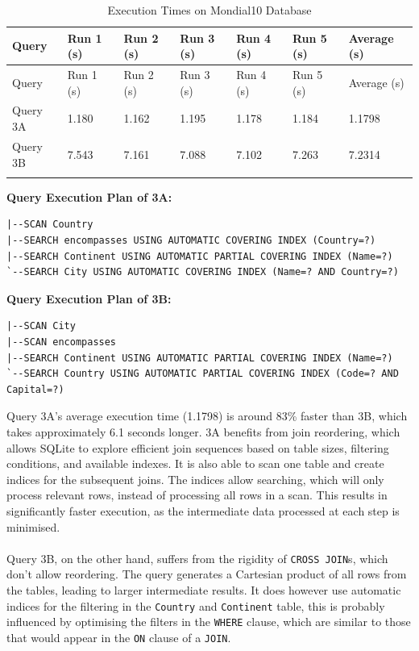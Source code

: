 \documentclass[11pt]{article}
\begin{document}
\begin{longtable}{|l|l|l|l|l|l|l|}
\hline
Query & Run 1 (s) & Run 2 (s) & Run 3 (s) & Run 4 (s) & Run 5 (s) & Average (s) \\
\hline
\endfirsthead
\hline
Query & Run 1 (s) & Run 2 (s) & Run 3 (s) & Run 4 (s) & Run 5 (s) & Average (s) \\
\hline
\endhead
Query 3A & 1.180 & 1.162 & 1.195 & 1.178 & 1.184 & 1.1798 \\
Query 3B & 7.543 & 7.161 & 7.088 & 7.102 & 7.263 & 7.2314 \\
\hline
\caption{Execution Times on Mondial10 Database}
\end{longtable}


\textbf{Query Execution Plan of 3A:}
\begin{verbatim}
|--SCAN Country
|--SEARCH encompasses USING AUTOMATIC COVERING INDEX (Country=?)
|--SEARCH Continent USING AUTOMATIC PARTIAL COVERING INDEX (Name=?)
`--SEARCH City USING AUTOMATIC COVERING INDEX (Name=? AND Country=?)
\end{verbatim}


\textbf{Query Execution Plan of 3B:}
\begin{verbatim}
|--SCAN City
|--SCAN encompasses
|--SEARCH Continent USING AUTOMATIC PARTIAL COVERING INDEX (Name=?)
`--SEARCH Country USING AUTOMATIC PARTIAL COVERING INDEX (Code=? AND Capital=?)
\end{verbatim}

\noindent Query 3A's average execution time (1.1798) is around 83\% faster than 3B, which takes approximately 6.1 seconds longer.
3A benefits from join reordering, which allows SQLite to explore efficient join sequences based on table sizes, filtering conditions,
and available indexes. It is also able to scan one table and create indices for the subsequent joins. The indices allow searching, which will
only process relevant rows, instead of processing all rows in a scan. This results in significantly faster execution, as the intermediate data processed at each step is minimised.
\\ \\
Query 3B, on the other hand, suffers from the rigidity of \texttt{CROSS JOIN}s, which don't allow reordering. The query generates a Cartesian product
of all rows from the tables, leading to larger intermediate results. It does however use automatic indices for the filtering
in the \texttt{Country} and \texttt{Continent} table, this is probably influenced by optimising the filters in the \texttt{WHERE} clause, which are similar
to those that would appear in the \texttt{ON} clause of a \texttt{JOIN}.
\end{document}

